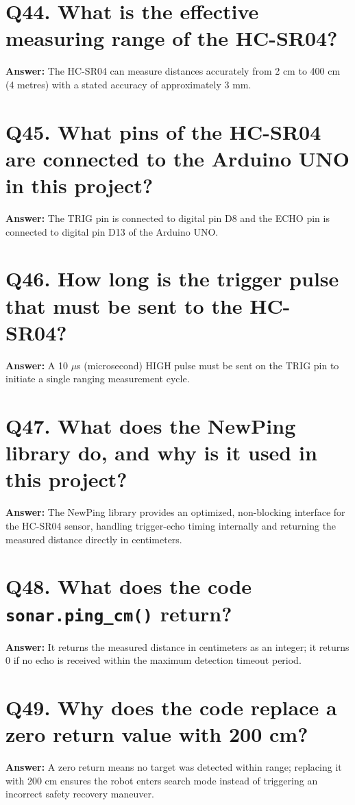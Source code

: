 \documentclass[12pt,a4paper,oneside]{report}
\begin{document}
\section{Q44. What is the effective measuring range of the HC-SR04?}
\textbf{Answer:} The HC-SR04 can measure distances accurately from 2 cm to 400 cm (4 metres) with a stated accuracy of approximately 3 mm.

\section{Q45. What pins of the HC-SR04 are connected to the Arduino UNO in this project?}
\textbf{Answer:} The TRIG pin is connected to digital pin D8 and the ECHO pin is connected to digital pin D13 of the Arduino UNO.

\section{Q46. How long is the trigger pulse that must be sent to the HC-SR04?}
\textbf{Answer:} A 10 $\mu$s (microsecond) HIGH pulse must be sent on the TRIG pin to initiate a single ranging measurement cycle.

\section{Q47. What does the NewPing library do, and why is it used in this project?}
\textbf{Answer:} The NewPing library provides an optimized, non-blocking interface for the HC-SR04 sensor, handling trigger-echo timing internally and returning the measured distance directly in centimeters.

\section{Q48. What does the code \texttt{sonar.ping\_cm()} return?}
\textbf{Answer:} It returns the measured distance in centimeters as an integer; it returns 0 if no echo is received within the maximum detection timeout period.

\section{Q49. Why does the code replace a zero return value with 200 cm?}
\textbf{Answer:} A zero return means no target was detected within range; replacing it with 200 cm ensures the robot enters search mode instead of triggering an incorrect safety recovery maneuver.
\end{document}

